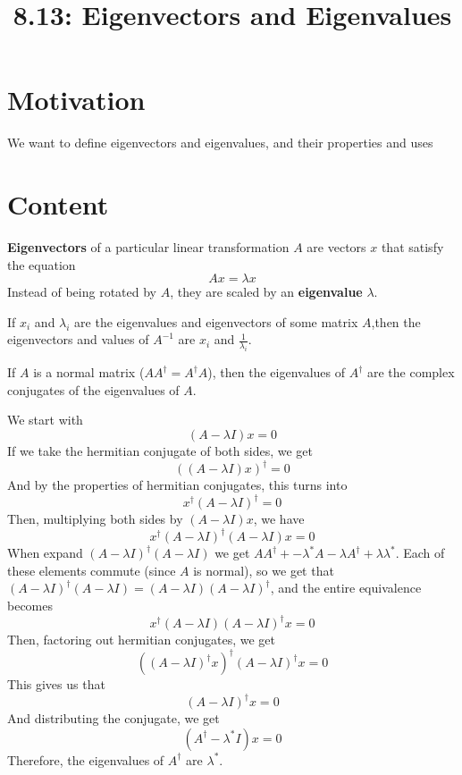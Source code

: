 \documentclass{article}
\title{8.13: Eigenvectors and Eigenvalues}
\begin{document}
\maketitle
\section{Motivation}
We want to define eigenvectors and eigenvalues, and their properties and uses

\section{Content}
\begin{definition}
    \textbf{Eigenvectors} of a particular linear transformation $A$ are vectors $x$ that satisfy the equation $$Ax = \lambda x$$Instead of being rotated by $A$, they are scaled by an \textbf{eigenvalue} $\lambda$. 
\end{definition}
\begin{proposition}
If $x_i$ and $\lambda_i$ are the eigenvalues and eigenvectors of some matrix $A$,then the eigenvectors and values of $A ^{-1}$ are $x_i$ and $\frac{1}{\lambda_i}$. 
\end{proposition}

\begin{proposition}
If $A$ is a normal matrix ($AA ^\dagger = A ^\dagger A$), then the eigenvalues of $A ^\dagger $ are the complex conjugates of the eigenvalues of $A$. 
\end{proposition}

\begin{customproof}
We start with $$(A-\lambda I)x = 0$$If we take the hermitian conjugate of both sides, we get $$((A - \lambda I)x)^\dagger = 0$$And by the properties of hermitian conjugates, this turns into $$x ^\dagger (A-\lambda I) ^\dagger =0$$Then, multiplying both sides by $(A-\lambda I)x$, we have$$x ^\dagger (A-\lambda I) ^\dagger (A-\lambda I)x = 0$$When expand $(A-\lambda I)^\dagger (A-\lambda I)$ we get $AA ^\dagger + -\lambda^* A - \lambda A ^\dagger  + \lambda\lambda^*$. Each of these elements commute (since $A$ is normal), so we get that $(A-\lambda I) ^\dagger (A-\lambda I) = (A-\lambda I)(A-\lambda I) ^\dagger$, and the entire equivalence becomes $$x ^\dagger (A-\lambda I)(A-\lambda I) ^\dagger x = 0$$Then, factoring out hermitian conjugates, we get $$((A-\lambda I) ^\dagger x)^\dagger (A-\lambda I) ^\dagger x = 0$$This gives us that $$(A-\lambda I) ^\dagger x = 0$$And distributing the conjugate, we get $$(A^\dagger-\lambda^*I)x = 0$$ Therefore, the eigenvalues of $A ^\dagger $ are $\lambda^*$. 
\end{customproof}
\end{document}
